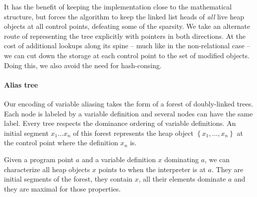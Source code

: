 \documentclass[11pt]{article}
\begin{document}
It has the benefit of keeping the implementation close to the mathematical structure, but forces the algorithm to keep the linked list heads of \emph{all} live heap objects at all control points, defeating some of the sparsity.
We take an alternate route of representing the tree explicitly with pointers in both directions. At the cost of additional lookups along its spine -- much like in the non-relational case -- we can cut down the storage at each control point to the set of modified objects. Doing this, we also avoid the need for hash-consing.

\paragraph{Alias tree} Our encoding of variable aliasing takes the form of a forest of doubly-linked trees.
Each node is labeled by a variable definition and several nodes can have the same label.
Every tree respects the dominance ordering of variable definitions.
An initial segment $x_1\dots x_n$ of this forest represents the heap object $\left\{x_1,\dots,x_n\right\}$ at the control point where the definition $x_n$ is.

Given a program point $a$ and a variable definition $x$ dominating $a$, we can characterize all heap objects $x$ points to when the interpreter is at $a$. They are initial segments of the forest, they contain $x$, all their elements dominate $a$ and they are maximal for those properties.
\end{document}
